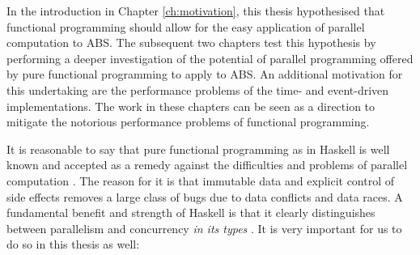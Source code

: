 \medskip

In the introduction in Chapter \ref{ch:motivation}, this thesis hypothesised that functional programming should allow for the easy application of parallel computation to ABS. The subsequent two chapters test this hypothesis by performing a deeper investigation of the potential of parallel programming offered by pure functional programming to apply to ABS. An additional motivation for this undertaking are the performance problems of the time- and event-driven implementations. The work in these chapters can be seen as a direction to mitigate the notorious performance problems of functional programming.

\medskip

It is reasonable to say that pure functional programming as in Haskell is well known and accepted as a remedy against the difficulties and problems of parallel computation \cite{marlow_parallel_2013}. The reason for it is that immutable data and explicit control of side effects removes a large class of bugs due to data conflicts and data races. A fundamental benefit and strength of Haskell is that it clearly distinguishes between parallelism and concurrency \textit{in its types} \cite{jones_tackling_2002}. It is very important for us to do so in this thesis as well:

